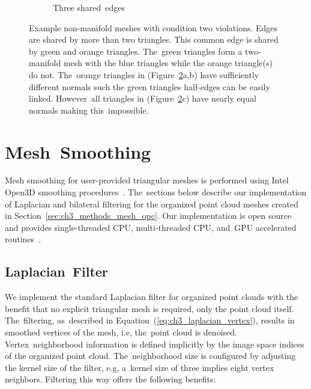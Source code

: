 \begin{figure}[H]
\begin{subfigure}{.30\linewidth}
    \caption{Three shared~edges\label{fig:ch3_NonMainifoldCond2C}}\vspace{6pt}
  \end{subfigure}
  \caption[Example non-manifold meshes with condition two violations]{Example non-manifold meshes with condition two violations. Edges are shared by more than two triangles. This common edge is shared by green and orange triangles. The~green triangles form a two-manifold mesh with the blue triangles while the orange triangle(s) do not. The~orange triangles in (Figure~\ref{fig:ch3_NonMainifoldCond2}a,b) have sufficiently different normals such the green triangles half-edges can be easily linked. However~all triangles in (Figure~\ref{fig:ch3_NonMainifoldCond2}c) have nearly equal normals making this~impossible.}\label{fig:ch3_NonMainifoldCond2}
\end{figure}
\unskip




\section{Mesh~Smoothing}\label{sec:ch3_methods_mesh_smoothing}

Mesh smoothing for user-provided triangular meshes is performed using Intel Open3D smoothing procedures~\cite{zhou_open3d_2018}.  The~sections below describe our implementation of Laplacian and bilateral filtering for the organized point cloud meshes created in Section~\ref{sec:ch3_methods_mesh_opc}.  Our implementation is open source and provides single-threaded CPU, multi-threaded CPU, and~\ac{GPU} accelerated routines~\cite{Castagno_Github_opf}. 

\subsection{Laplacian~Filter}\label{sec:ch3_methods_mesh_smoothing_laplacian}

We implement the standard Laplacian filter for organized point clouds with the benefit that no explicit triangular mesh is required, only the point cloud itself. The~filtering, as~described in Equation~(\ref{eq:ch3_laplacian_vertex}), results in smoothed vertices of the mesh, i.e, the~point cloud is denoised. Vertex~neighborhood information is defined implicitly by the image space indices of the organized point cloud.  The~neighborhood size is configured by adjusting the kernel size of the filter, e.g, a~kernel size of three implies eight vertex neighbors. Filtering this way offers the following benefits:

